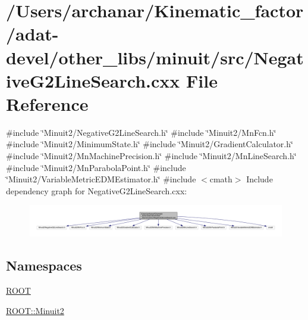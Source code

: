 \hypertarget{adat-devel_2other__libs_2minuit_2src_2NegativeG2LineSearch_8cxx}{}\section{/\+Users/archanar/\+Kinematic\+\_\+factor/adat-\/devel/other\+\_\+libs/minuit/src/\+Negative\+G2\+Line\+Search.cxx File Reference}
\label{adat-devel_2other__libs_2minuit_2src_2NegativeG2LineSearch_8cxx}
{\ttfamily \#include \char`\"{}Minuit2/\+Negative\+G2\+Line\+Search.\+h\char`\"{}}\newline
{\ttfamily \#include \char`\"{}Minuit2/\+Mn\+Fcn.\+h\char`\"{}}\newline
{\ttfamily \#include \char`\"{}Minuit2/\+Minimum\+State.\+h\char`\"{}}\newline
{\ttfamily \#include \char`\"{}Minuit2/\+Gradient\+Calculator.\+h\char`\"{}}\newline
{\ttfamily \#include \char`\"{}Minuit2/\+Mn\+Machine\+Precision.\+h\char`\"{}}\newline
{\ttfamily \#include \char`\"{}Minuit2/\+Mn\+Line\+Search.\+h\char`\"{}}\newline
{\ttfamily \#include \char`\"{}Minuit2/\+Mn\+Parabola\+Point.\+h\char`\"{}}\newline
{\ttfamily \#include \char`\"{}Minuit2/\+Variable\+Metric\+E\+D\+M\+Estimator.\+h\char`\"{}}\newline
{\ttfamily \#include $<$cmath$>$}\newline
Include dependency graph for Negative\+G2\+Line\+Search.\+cxx\+:
\nopagebreak
\begin{figure}[H]
\begin{center}
\leavevmode
\includegraphics[width=350pt]{d5/dc3/adat-devel_2other__libs_2minuit_2src_2NegativeG2LineSearch_8cxx__incl}
\end{center}
\end{figure}
\subsection*{Namespaces}
\begin{DoxyCompactItemize}
\item 
 \mbox{\hyperlink{namespaceROOT}{R\+O\+OT}}
\item 
 \mbox{\hyperlink{namespaceROOT_1_1Minuit2}{R\+O\+O\+T\+::\+Minuit2}}
\end{DoxyCompactItemize}
